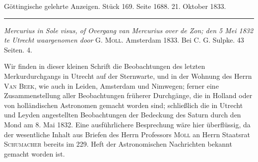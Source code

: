 \clearpage
{}
\hypertarget{native-653-lower}{}
\begin{center}\small Göttingische gelehrte Anzeigen. Stück 169. Seite 1688. 21. Oktober 1833.\\[3pt]\rule{.72\linewidth}{.3pt}\end{center}

\emph{Mercurius in Sole visus, of Overgang van Mercurius over de Zon; den 5 Mei \textup{1832} te Utrecht waargenomen door} G. \textsc{Moll}. Amsterdam 1833. Bei C. G. Sulpke. 43 Seiten. 4.

Wir finden in dieser kleinen Schrift die Beobachtungen des letzten Merkurdurchgangs in Utrecht auf der Sternwarte, und in der Wohnung des Herrn \textsc{Van Beek}, wie auch in Leiden, Amsterdam und Nimwegen; ferner eine Zusammenstellung aller Beobachtungen früherer Durchgänge, die in Holland oder von holländischen Astronomen gemacht worden sind; schließlich die in Utrecht und Leyden angestellten Beobachtungen der Bedeckung des Saturn durch den Mond am 8. Mai 1832. Eine ausführlichere Besprechung wäre hier überflüssig, da der wesentliche Inhalt aus Briefen des Herrn Professors \textsc{Moll} an Herrn Staatsrat \textsc{Schumacher} bereits im 229. Heft der Astronomischen Nachrichten bekannt gemacht worden ist.
